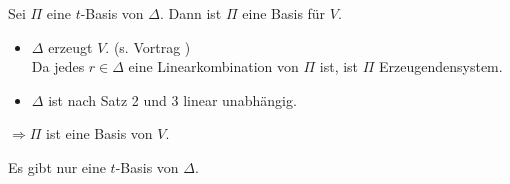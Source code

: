 \documentclass[18pt]{beamer}
\begin{document}
\begin{frame}
    \begin{satz} %
        Sei \( \Pi \) eine \(t\)-Basis von \( \Delta \). Dann ist 
        \( \Pi \) eine Basis für \( V \).
    \end{satz}
    \pause
    \begin{bew}
        \begin{itemize}
            \item \( \Delta \) erzeugt \( V \). (s. Vortrag )\\
            Da jedes \( r \in \Delta \) eine Linearkombination von \( \Pi \) ist, 
            ist \( \Pi \) Erzeugendensystem. \pause
            \item<2-> \( \Delta \) ist nach Satz 2 und 3 linear unabhängig.
        \end{itemize} \pause
        \( \Rightarrow \Pi \) ist eine Basis von \(V\).
    \end{bew}
\end{frame}

\begin{frame}
    \begin{satz} %
        Es gibt nur eine \( t \)-Basis von \( \Delta \).
    \end{satz}
\end{frame}
\end{document}
